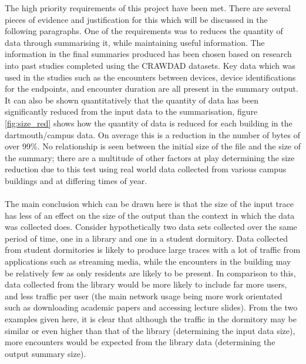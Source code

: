 The high priority requirements of this project have been met. There are several pieces of evidence and justification for this which will be discussed in the following paragraphs. One of the requirements was to reduces the quantity of data through summarising it, while maintaining useful information. The information in the final summaries produced has been chosen based on research into past studies completed using the CRAWDAD datasets. Key data which was used in the studies such as the encounters between devices, device identifications for the endpoints, and encounter duration are all present in the summary output. It can also be shown quantitatively that the quantity of data has been significantly reduced from the input data to the summarisation, figure \ref{fig:size_red} shows how the quantity of data is reduced for each building in the dartmouth/campus data. On average this is a reduction in the number of bytes of over 99\%. No relationship is seen between the initial size of the file and the size of the summary; there are a multitude of other factors at play determining the size reduction due to this test using real world data collected from various campus buildings and at differing times of year. \\\\
The main conclusion which can be drawn here is that the size of the input trace has less of an effect on the size of the output than the context in which the data was collected does. Consider hypothetically two data sets collected over the same period of time, one in a library and one in a student dormitory. Data collected from student dormitories is likely to produce large traces with a lot of traffic from applications such as streaming media, while the encounters in the building may be relatively few as only residents are likely to be present. In comparison to this, data collected from the library would be more likely to include far more users, and less traffic per user (the main network usage being more work orientated such as downloading academic papers and accessing lecture slides). From the two examples given here, it is clear that although the traffic in the dormitory may be similar or even higher than that of the library (determining the input data size), more encounters would be expected from the library data (determining the output summary size).


